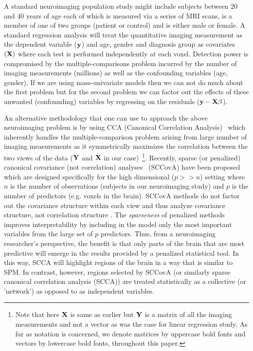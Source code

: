 \documentclass{llncs}
\newcommand{\X}{{\bf X}}
\newcommand{\Y}{{\bf Y}}
\newcommand{\y}{{\bf y}}
\begin{document}
A standard neuroimaging population study might include subjects
between 20 and 40 years of age each of which is measured via a series
of MRI scans, is a member of one of two groups (patient or control)
and is either male or female.  A standard regression analysis will
treat the quantitative imaging measurement as the dependent variable
($\y$) and age, gender and diagnosis group as covariates $({\X})$
where each test is performed independently at each voxel.  Detection
power is compromised by the multiple-comparisons problem incurred by
the number of imaging measurements (millions) as well as the
confounding variables (age, gender).  If we are using mass-univariate
models then we can not do much about the first problem but for the
second problem we can factor out the effects of these unwanted
(confounding) variables by regressing on the residuals ($\y
-\X\beta$).

An alternative methodology that one can use to approach the above
neuroimaging problem is by using CCA (Canonical Correlation
Analysis)~\cite{hotellingcca} which inherently handles the
multiple-comparison problem arising from large number of imaging
measurements as it symmetrically maximizes the correlation between the two views of
the data ($\Y$ and $\X$ in our case)~\footnote{Note that here {$\X$}
is same as earlier but $\Y$ is a matrix of all the imaging
measurements and not a vector as was the case for linear regression
study. As far as notation is concerned, we denote matrices by
uppercase bold fonts and vectors by lowercase bold fonts, throughout
this paper. }. Recently, sparse (or penalized) canonical covariance
(not correlation) analyses~\cite{parkhomenko,witten,lykou} (SCCovA) have been proposed which are
designed specifically for the high dimensional ($p >>n$) setting 
where $n$ is the number of observations (subjects in our
neuroimaging study) and $p$ is the number of predictors (e.g. voxels
in the brain).  SCCovA methods do not factor out the
covariance structure within each view and thus analyze covariance structure, not
correlation structure \cite{cherry}.  The {\em sparseness} of penalized methods improves
interpretability by including in the model only the most important
variables from the large set of $p$ predictors.  Thus, from a
neuroimaging researcher's perspective, the benefit is that only parts
of the brain that are most predictive will emerge in the results
provided by a penalized statistical tool.  In this way, SCCA will
highlight regions of the brain in a way that is similar to SPM.  In
contrast, however, regions selected by SCCovA (or similarly sparse canonical correlation
analysis (SCCA)) are treated statistically as a
collective (or 'network') as opposed to as independent variables.  
\end{document}
